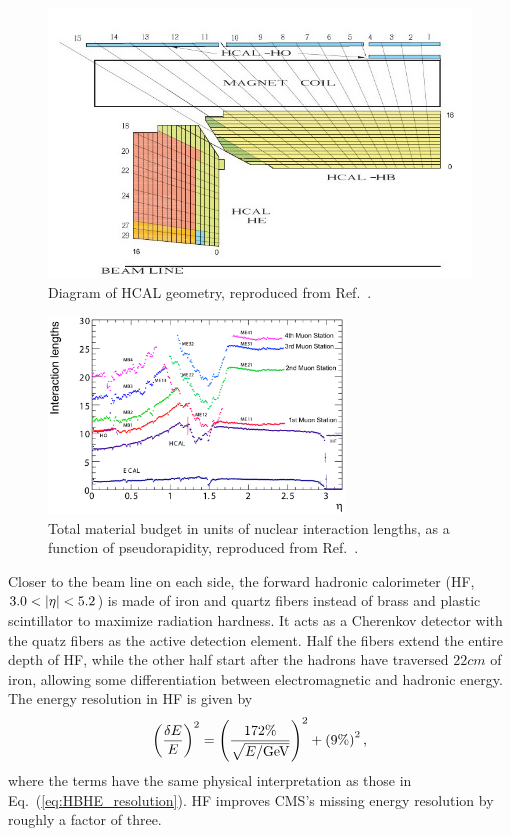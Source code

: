 \begin{figure}[htbp]
  \centering
  \includegraphics[width=\textwidth]{experiment/hcal.png}
  \caption[HCAL geometry]{
    Diagram of HCAL geometry, reproduced from Ref.~\cite{Chatrchyan:2008zzk}.
  }\label{fig:hcal}
\end{figure}

\begin{figure}[htbp]
  \centering
  \includegraphics[width=0.7\textwidth]{experiment/hcalMaterial.png}
  \caption[Total material budget in nuclear interaction lengths]{
    Total material budget in units of nuclear interaction lengths, as a function of pseudorapidity, reproduced from Ref.~\cite{Chatrchyan:2008zzk}.
  }\label{fig:hcalMaterial}
\end{figure}

Closer to the beam line on each side, the forward hadronic calorimeter (HF, $3.0 < \lvert \eta \rvert < 5.2$) is made of iron and quartz fibers instead of brass and plastic scintillator to maximize radiation hardness.
It acts as a Cherenkov detector with the quatz fibers as the active detection element.
Half the fibers extend the entire depth of HF, while the other half start after the hadrons have traversed $22\unit{cm}$ of iron, allowing some differentiation between electromagnetic and hadronic energy.
The energy resolution in HF is given by
\begin{equation}
  \left(\frac{\delta E}{E}\right)^2 = \left(\frac{172\%}{\sqrt{E/\mathrm{Ge\hspace{-.08em}V}}}\right)^2 + \left(9\%\right)^2,
\end{equation}
where the terms have the same physical interpretation as those in Eq.~(\ref{eq:HBHE_resolution}).
HF improves CMS's missing energy resolution by roughly a factor of three.



